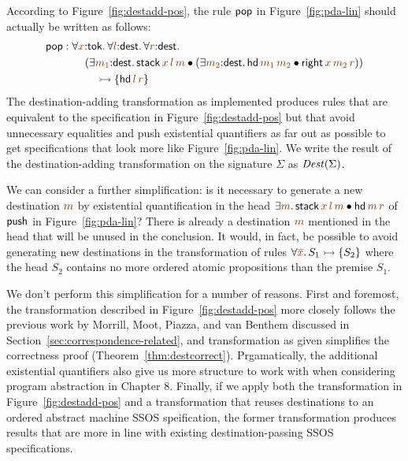 According to Figure~\ref{fig:destadd-pos}, the rule 
${\sf pop}$ in Figure~\ref{fig:pda-lin} should actually be written as
follows:
\begin{align*} 
  {\sf pop} & : 
  \forall \lf x{:}{\sf tok}.\,
  \forall \lf l{:}{\sf dest}.\,
  \forall \lf r{:}{\sf dest}.\,
  \\
  & \qquad (\exists \lf{m_1}{:}{\sf dest}.\, {\sf stack}\,\lf{x}\,\lf{l}\,\lf{m} \fuse
   (\exists \lf{m_2}{:}{\sf dest}.\, {\sf hd}\,\lf{m_1}\,\lf{m_2} \fuse
     {\sf right}\,\lf{x}\,\lf{m_2}\,\lf{r}))
  \\ 
  & \qquad\quad \lefti
  \{ 
    {\sf hd}\,\lf{l}\,\lf{r}
  \}
\end{align*}
The destination-adding transformation as
implemented produces rules that are
equivalent to the specification in Figure~\ref{fig:destadd-pos}
but that avoid unnecessary equalities and push existential quantifiers
as far out as possible to get specifications that look more like
Figure~\ref{fig:pda-lin}. We write the result of the destination-adding
transformation on the signature $\Sigma$ as ${\it Dest}(\Sigma)$. 

We can consider a further simplification: is it necessary to generate
a new destination $\lf{m}$ by existential quantification in the head
$\exists \lf{m}.\,{\sf stack}\,\lf{x}\,\lf{l}\,\lf{m} \fuse {\sf hd}\,\lf{m}\,\lf{r}$ of ${\sf
  push}$ in Figure~\ref{fig:pda-lin}? There is already a destination
$\lf m$ mentioned in the head that will be unused in the conclusion.  It
would, in fact, be possible to avoid generating new destinations in
the transformation of rules $\forall \lf{\overline{x}}.\,S_1 \lefti \{ S_2
\}$ where the head $S_2$ contains no more ordered atomic propositions
than the premise $S_1$. 

We don't perform this simplification for a number of reasons. First
and foremost, the transformation described in
Figure~\ref{fig:destadd-pos} more closely follows the previous work by
Morrill, Moot, Piazza, and van Benthem discussed in
Section~\ref{sec:correspondence-related}, and transformation as given
simplifies the correctness proof (Theorem~\ref{thm:destcorrect}).
Prgamatically, the additional existential quantifiers also give us
more structure to work with when considering program abstraction in
Chapter 8. Finally, if we apply both the transformation in
Figure~\ref{fig:destadd-pos} and a transformation that reuses
destinations to an ordered abstract machine SSOS speification, the
former transformation produces results that are more in line with
existing destination-passing SSOS specifications.

